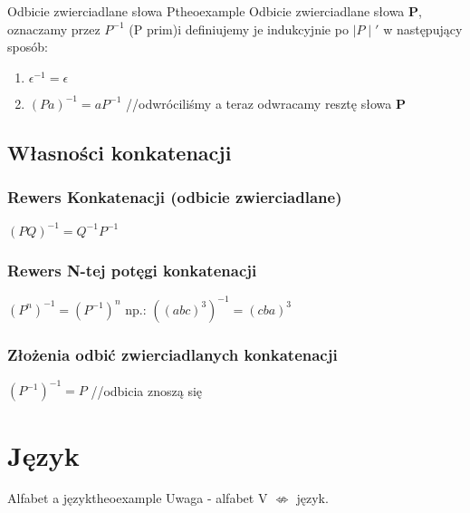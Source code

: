 		\begin{mytheo}{Odbicie zwierciadlane słowa P}{theoexample}
			Odbicie zwierciadlane słowa \textbf{P}, oznaczamy przez $P^{-1}$ 
			(P prim)i definiujemy je indukcyjnie po $\mid P \mid '$ w następujący sposób:
		
			\begin{enumerate}[label=(\roman*)]
				\item $\epsilon^{-1} = \epsilon$
				\item $(Pa)^{-1} = aP^{-1}$  //odwróciliśmy a teraz odwracamy resztę słowa 			
						\textbf{P}
			\end{enumerate} 
		
		\end{mytheo}

	
	\subsection{Własności konkatenacji}
		\subsubsection{Rewers Konkatenacji (odbicie zwierciadlane)}
			$(PQ)^{-1} = Q^{-1}P^{-1}$
	
		\subsubsection{Rewers N-tej potęgi konkatenacji}
			$(P^{n})^{-1} = (P^{-1})^{n}$  np.: $((abc)^{3})^{-1} = (cba)^{3}$
		
		\subsubsection{Złożenia odbić zwierciadlanych konkatenacji}
			$(P^{-1})^{-1} = P$ //odbicia znoszą się



\newpage
\section{Język}
	\begin{mytheo}{Alfabet a język}{theoexample}
		Uwaga - alfabet V $\not\Leftrightarrow$ język. \newline
	\end{mytheo}

